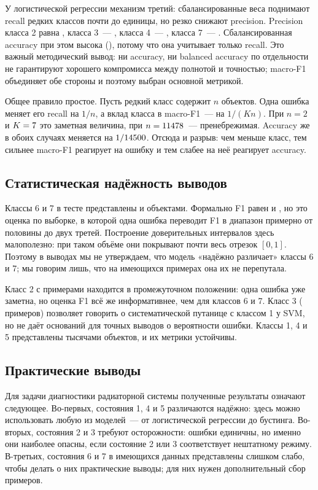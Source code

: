 \documentclass[14pt,a4paper]{extarticle}
\begin{document}
У логистической регрессии механизм третий: сбалансированные веса
поднимают recall редких классов почти до единицы, но резко снижают
precision. Precision класса 2 равна \PrecLogregClassTwo, класса 3~---
\PrecLogregClassThree, класса 4~--- \PrecLogregClassFour, класса 7~---
\PrecLogregClassSeven. Сбалансированная accuracy при этом высока
(\BalLogreg), потому что она учитывает только recall. Это важный
методический вывод: ни accuracy, ни balanced accuracy по отдельности
не гарантируют хорошего компромисса между полнотой и точностью;
macro-F1 объединяет обе стороны и поэтому выбран основной метрикой.

Общее правило простое. Пусть редкий класс содержит $n$ объектов.
Одна ошибка меняет его recall на $1/n$, а вклад класса в macro-F1~---
на $1/(K n)$. При $n=2$ и $K=7$ это заметная величина, при
$n=11478$~--- пренебрежимая. Accuracy же в обоих случаях
меняется на $1/14500$. Отсюда и разрыв: чем меньше класс, тем сильнее
macro-F1 реагирует на ошибку и тем слабее на неё реагирует accuracy.

\subsection{Статистическая надёжность выводов}

Классы 6 и 7 в тесте представлены \SupportClassSix{} и
\SupportClassSeven{} объектами. Формально F1 равен \FOneClassSix{} и
\FOneClassSeven, но это оценка по выборке, в которой одна ошибка
переводит F1 в диапазон примерно от половины до двух третей. Построение
доверительных интервалов здесь малополезно: при таком объёме они
покрывают почти весь отрезок $[0,1]$. Поэтому в выводах мы не
утверждаем, что модель «надёжно различает» классы 6 и 7; мы говорим
лишь, что на имеющихся примерах она их не перепутала.

Класс 2 с \SupportClassTwo{} примерами находится в промежуточном
положении: одна ошибка уже заметна, но оценка F1 \FOneClassTwo{}
всё же информативнее, чем для классов 6 и 7. Класс 3
(\SupportClassThree{} примеров) позволяет говорить о систематической
путанице с классом 1 у SVM, но не даёт оснований для точных выводов
о вероятности ошибки. Классы 1, 4 и 5 представлены тысячами объектов,
и их метрики устойчивы.

\subsection{Практические выводы}

Для задачи диагностики радиаторной системы полученные результаты
означают следующее. Во-первых, состояния 1, 4 и 5 различаются надёжно:
здесь можно использовать любую из моделей~--- от логистической регрессии
до бустинга. Во-вторых, состояния 2 и 3 требуют осторожности: ошибки
единичны, но именно они наиболее опасны, если состояние 2 или 3
соответствует нештатному режиму. В-третьих, состояния 6 и 7 в имеющихся
данных представлены слишком слабо, чтобы делать о них практические
выводы; для них нужен дополнительный сбор примеров.
\end{document}
